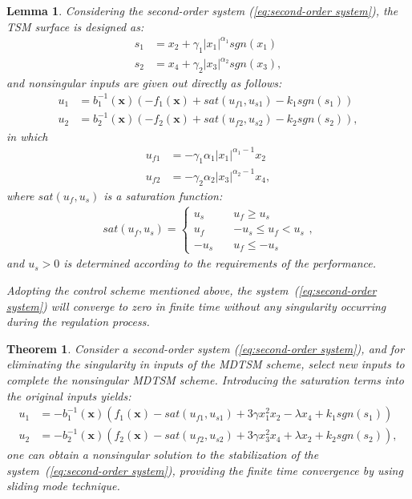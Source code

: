 \documentclass[3p]{elsarticle}
\theoremstyle{plain}
\newtheorem{mylem}{Lemma}
\newtheorem{mythm}{Theorem}
\theoremstyle{remark}
\begin{document}
\begin{mylem}\label{lemma:3}
Considering the second-order system (\ref{eq:second-order system}), the TSM surface is designed as:
\begin{align*}
s_1 &= x_2+\gamma_1\vert x_1\vert^{\alpha_1}sgn(x_1)\\
s_2 &= x_4+\gamma_2\vert x_3\vert^{\alpha_2}sgn(x_3),
\end{align*}
and nonsingular inputs are given out directly as follows:
\begin{align*}
u_1 &= b^{-1}_1(\bm x)(-f_1(\bm x)+sat(u_{f1},u_{s1})-k_1sgn(s_1))\\
u_2 &= b^{-1}_2(\bm x)(-f_2(\bm x)+sat(u_{f2},u_{s2})-k_2sgn(s_2)),
\end{align*}
in which
\begin{align*}
u_{f1}&=-\gamma_1\alpha_1\vert x_1\vert^{\alpha_1-1}x_2\\
u_{f2}&=-\gamma_2\alpha_2\vert x_3\vert^{\alpha_2-1}x_4,
\end{align*}
where $sat(u_f,u_s)$ is a saturation function:
\begin{align}
sat(u_f,u_s)=
\begin{cases}
u_s\quad &u_f\ge u_s\\
u_f\quad &-u_s\le u_f< u_s\\
-u_s\quad &u_f\le -u_s
\end{cases},
\end{align}
and $u_s>0$ is determined according to the requirements of the performance.\par
Adopting the control scheme mentioned above, the system~(\ref{eq:second-order system}) will converge to zero in finite time without any singularity occurring during the regulation process.
\end{mylem}
\begin{mythm}\label{theorem:3}
Consider a second-order system (\ref{eq:second-order system}), and for eliminating the singularity in inputs of the MDTSM scheme, select new inputs to complete the nonsingular MDTSM scheme. Introducing the saturation terms into the original inputs yields:
\begin{align}
u_1 &= -b_1^{-1}(\bm x)(f_1(\bm x)-sat(u_{f1},u_{s1})+3\gamma x_1^2x_2-\lambda x_4+k_1sgn(s_1))\\
u_2 &= -b_2^{-1}(\bm x)(f_2(\bm x)-sat(u_{f2},u_{s2})+3\gamma x_3^2x_4+\lambda x_2+k_2sgn(s_2)),\label{eq:nonsingular modified input}
\end{align}
one can obtain a nonsingular solution to the stabilization of the system~(\ref{eq:second-order system}), providing the finite time convergence by using sliding mode technique.
\end{mythm}
\end{document}
